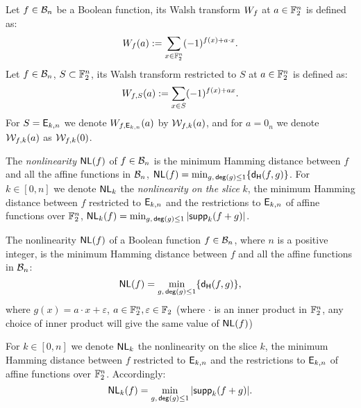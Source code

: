 \documentclass{llncs}
\begin{document}
\ifnum{}
\else

\begin{definition}\label{def:walsh_transform}
	Let $f\in \mathcal{B}_{n}$ be a Boolean function, its Walsh transform $W_{f}$ at $a \in \mathbb{F}_2^n$ is defined as:
	\[  W_{f} (a) := \sum_{x \in \mathbb{F}_2^n} (-1)^{f(x) +  a \cdot x }.\]
	Let $f\in \mathcal{B}_{n}$, $S \subset \mathbb{F}_2^n$, its Walsh transform restricted to $S$ at $a \in \mathbb{F}_2^n$ is defined as:
	\[  W_{f,S} (a) := \sum_{x\in S} (-1)^{f(x)+ax}.\]
	For $S=\mathsf{E}_{k,n}$ we denote $W_{f,\mathsf{E}_{k,n}} (a)$ by $\mathcal{W}_{f,k}(a)$, and for $a= 0_{n}$ we denote $\mathcal{W}_{f,k}(a)$ as $\mathcal{W}_{f,k}(0)$.
\end{definition}
\fi


\ifnum{}

The \emph{nonlinearity} $\mathsf{NL}(f)$ of $f\in \mathcal{B}_n$ is the minimum Hamming distance between $f$ and all the affine functions in $\mathcal{B}_n$, \ie $ \mathsf{NL}(f) = \min_{g,\, \mathsf{deg}(g)\leq 1} \{ \mathsf{d_H}(f,g) \}$.
	For $k\in [0,n]$ we denote $\mathsf{NL}_{k}$ the \emph{nonlinearity on the slice} $k$, the minimum Hamming distance between $f$ restricted to $\mathsf{E}_{k,n}$ and the restrictions to $\mathsf{E}_{k,n}$ of affine functions over $\mathbb{F}_2^n$, \ie $ \mathsf{NL}_{k}(f)=\min_{g,\, \mathsf{deg}(g)\leq 1} |\mathsf{supp}_{k}(f+g)|$.
\else
\begin{definition} \label{def:nl}
	The nonlinearity $\mathsf{NL}(f)$ of a Boolean function $f\in \mathcal{B}_n$, where $n$ is a positive integer, is the minimum Hamming distance between $f$ and all the affine functions in $\mathcal{B}_n$:
	\ifnum{}
	\vspace{-0.3cm}
	\else
	\fi
	\[ \mathsf{NL}(f) = \min_{g,\, \mathsf{deg}(g)\leq 1} \{ \mathsf{d_H}(f,g) \}{,} \]
	where $g(x)=a\cdot x+\varepsilon$, $a\in \mathbb{F}_2^n, \varepsilon\in \mathbb{F}_2$ 
	(where $\cdot$ is an inner product in $\mathbb{F}_2^n$, any choice of inner product will give the same value of $\mathsf{NL}(f)$)
	
	For $k\in [0,n]$ we denote $\mathsf{NL}_{k}$ the nonlinearity on the slice $k$, the minimum Hamming distance between $f$ restricted to $\mathsf{E}_{k,n}$ and the restrictions to $\mathsf{E}_{k,n}$ of affine functions over $\mathbb{F}_2^n$. 
	Accordingly: 
	\ifnum{}
	\vspace{-0.3cm}
	\else
	\fi
	\[\mathsf{NL}_{k}(f)=\min_{g,\, \mathsf{deg}(g)\leq 1} |\mathsf{supp}_{k}(f+g)|.\]
\end{definition}
\fi
\end{document}
